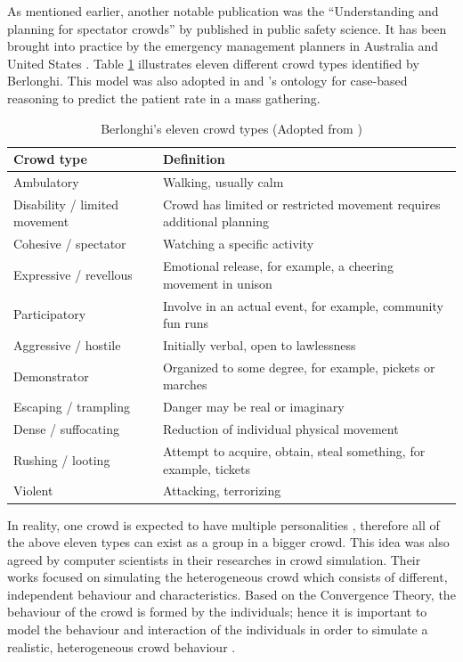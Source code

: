 As mentioned earlier, another notable publication was the ``Understanding and planning for spectator crowds'' by \citet{Berlonghi1995} published in public safety science. It has been brought into practice by the emergency management planners in Australia \citep{EMA1999} and United States \citep{FEMA2005}. Table \ref{table:berlonghiCrowdType} illustrates eleven different crowd types identified by Berlonghi. This model was also adopted in \citet{DelirHaghighi2013a} and \citet{Arbon2007}’s ontology for case-based reasoning to predict the patient rate in a mass gathering.

\begin{table}
	\caption{Berlonghi's eleven crowd types (Adopted from \citet{Zeitz2009})}
	\label{table:berlonghiCrowdType}
	\centering
	\begin{tabular}{|l|p{8cm}|}
		\hline
		\textbf{Crowd type} & \textbf{Definition} \\ \hline \hline
		Ambulatory & Walking, usually calm  \\ \hline
		Disability / limited movement & Crowd has limited or restricted movement requires additional planning \\ \hline
		Cohesive / spectator & Watching a specific activity \\ \hline
		Expressive / revellous & Emotional release, for example, a cheering movement in unison \\ \hline
		Participatory & Involve in an actual event, for example, community fun runs \\ \hline
		Aggressive / hostile & Initially verbal, open to lawlessness \\ \hline
		Demonstrator & Organized to some degree, for example, pickets or marches \\ \hline
		Escaping / trampling & Danger may be real or imaginary \\ \hline
		Dense / suffocating & Reduction of individual physical movement \\ \hline
		Rushing / looting & Attempt to acquire, obtain, steal something, for example, tickets \\ \hline
		Violent & Attacking, terrorizing \\ \hline
	\end{tabular}
\end{table}

In reality, one crowd is expected to have multiple personalities \citep{Berlonghi1995}, therefore all of the above eleven types can exist as a group in a bigger crowd. This idea was also agreed by computer scientists in their researches in crowd simulation. Their works focused on simulating the heterogeneous crowd which consists of different, independent behaviour and characteristics. Based on the Convergence Theory, the behaviour of the crowd is formed by the individuals; hence it is important to model the behaviour and interaction of the individuals in order to simulate a realistic, heterogeneous crowd behaviour \citep{Guy2011}.

